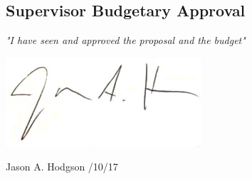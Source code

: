 \documentclass[11pt, a4paper]{article}
\begin{document}
\pagebreak	
 
 

\begin{center}

\section{Supervisor Budgetary Approval}


\vspace{2cm}
\textit
{"I have seen and approved the proposal and the budget"}
\vspace{1cm}

\includegraphics[scale=0.4]{JHsig.png}


Jason A. Hodgson /10/17

\end{center}
\end{document}
